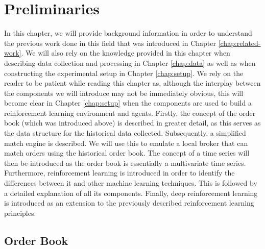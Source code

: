 \chapter{Preliminaries}
\label{chap:preliminaries}

In this chapter, we will provide background information in order to understand the previous work done in this field that was introduced in Chapter \ref{chap:related-work}.
We will also rely on the knowledge provided in this chapter when describing data collection and processing in Chapter \ref{chap:data} as well as when constructing the experimental setup in Chapter \ref{chap:setup}.
We rely on the reader to be patient while reading this chapter as, although the interplay between the components we will introduce may not be immediately obvious, this will become clear in Chapter \ref{chap:setup} when the components are used to build a reinforcement learning environment and agents. 
Firstly, the concept of the order book (which was introduced above) is described in greater detail, as this serves as the data structure for the  historical data collected.
Subsequently, a simplified match engine is described. We will use this to emulate a local broker that can match orders using the historical order book.
The concept of a time series will then be introduced as the order book is essentially a multivariate time series.
Furthermore, reinforcement learning is introduced in order to identify the differences between it and other machine learning techniques. This is followed by a detailed explanation of all its components.
Finally, deep reinforcement learning is introduced as an extension to the previously described reinforcement learning principles.

\section{Order Book}
\label{sec:order-book}

